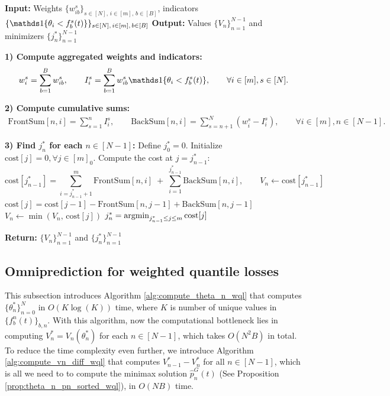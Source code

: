 \begin{algorithm}[h]
  \caption{Efficient computation of $V_n$ and its minimizer $j_n^*$} \label{alg:compute_vn}
  \begin{algorithmic}[1]
  \State \textbf{Input:} Weights $\{w_{ib}^s\}_{s \in [N],\, i \in [m],\, b \in [B]}$, indicators $\{\indi{\theta_i < f_b^s(t)}\}_{s \in [N],\, i \in [m],\, b \in [B]}$
  \State \textbf{Output:} Values $\{V_n\}_{n=1}^{N-1}$ and minimizers $\{j_n^*\}_{n=1}^{N-1}$
  
  \State \textbf{1) Compute aggregated weights and indicators:}
  \[
  w_i^s = \sum_{b=1}^B w_{ib}^s,
  \qquad
  I_i^s = \sum_{b=1}^B w_{ib}^s \indi{\theta_i < f_b^s(t)}, \qquad \forall i \in [m], s \in [N].
  \]
  
  \State \textbf{2) Compute cumulative sums:}
  \begin{align*}
    \text{FrontSum}[n, i]= \sum_{s=1}^{n} I_i^s, \qquad
    \text{BackSum}[n, i] = \sum_{s=n+1}^{N} (w_i^s - I_i^s), \qquad \forall i \in [m], n \in [N-1].
  \end{align*}
  
  \State \textbf{3) Find $j_n^*$ for each $n \in [N-1]$:}
  \State Define $j_0^* = 0$. Initialize $\mathrm{cost}[j] = 0, \forall j \in [m]_0$.
      \State Compute the cost at $j=j_{n-1}^*$:
      \[
      \mathrm{cost}[j_{n-1}^*] = \sum_{i=j_{n-1}^*+1}^m \text{FrontSum}[n,i]
      \;+\;
      \sum_{i=1}^{j_{n-1}^*} \text{BackSum}[n,i], \qquad
      V_n \gets \mathrm{cost}[j_{n-1}^*]
      \]
          \State $\mathrm{cost}[j] = \mathrm{cost}[j\!-\!1] - \text{FrontSum}[n, j\!-\!1] + \text{BackSum}[n, j\!-\!1]$
          \State $V_n \gets \min(V_n, \, \mathrm{cost}[j])$
      \EndFor
      \State $j_n^* = \operatorname*{argmin}_{j_{n-1}^* \leq j \leq m} \mathrm{cost}[j]$
  \EndFor
  
  \State \textbf{Return:} $\{V_n\}_{n=1}^{N-1}$ and $\{j_n^*\}_{n=1}^{N-1}$
  \end{algorithmic}
\end{algorithm}



\subsection{Omniprediction for weighted quantile losses} \label{appsubsec:wql_fast}
This subsection introduces Algorithm \ref{alg:compute_theta_n_wql} that computes $\{\theta_n^*\}_{n=0}^N$ in $O(K\log(K))$ time, where $K$ is number of unique values in $\{f_b^n(t)\}_{b,n}$. With this algorithm, now the computational bottleneck lies in computing $V_n^* = V_n(\theta_n^*)$ for each $n \in [N-1]$, which takes $O(N^2B)$ in total. To reduce the time complexity even further, we introduce Algorithm \ref{alg:compute_vn_diff_wql} that computes $V_{n-1}^* - V_n^*$ for all $n \in [N-1]$, which is all we need to to compute the minimax solution $\hat{p}^G_n(t)$ (See Proposition \ref{prop:theta_n_pn_sorted_wql}), in $O(NB)$ time. \smallskip

